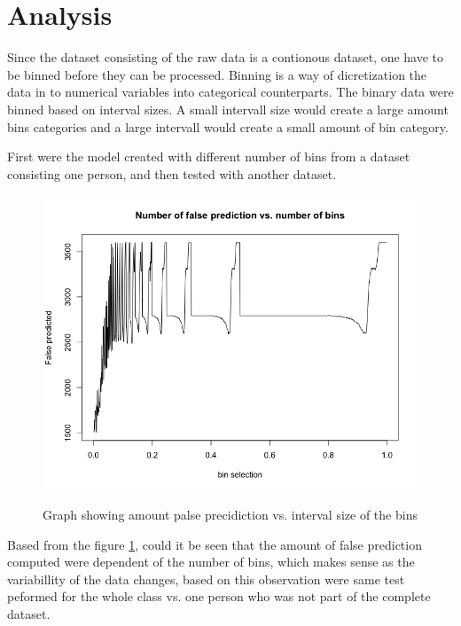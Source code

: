 \documentclass[10pt,a4paper]{article}
\begin{document}
\section{Analysis}
Since the dataset consisting of the raw data is a contionous dataset, one have to be binned before they can be processed. Binning is a way of dicretization the data in to numerical variables into categorical counterparts. The binary data were binned based on interval sizes.  A small intervall size would create a large amount bins categories and a large intervall would create a small amount of bin category.  

First were the model created with different number of bins from a dataset consisting one person, and then tested with another dataset.

\begin{figure}[H] 
\centering
\includegraphics[width = \textwidth]{number_of_false_prediction_vs_number_of_bins_plot.png}
\label{fig:false_g_g}
\caption{Graph showing amount palse precidiction vs. interval size of the bins}
\end{figure}

Based from the figure \ref{fig:false_g_g}, could it be seen that  the amount of false prediction computed were dependent of the number of bins, which makes sense as the variabillity of the data changes, based on this observation were same test peformed for the whole class vs. one person who was not part of the complete dataset. 
\end{document}
